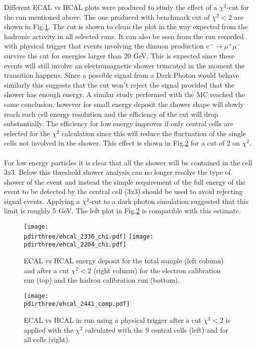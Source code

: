 Different ECAL vs HCAL plots were produced to study the effect of a
$\chi^2$-cut for the run mentioned above. The one produced with
benchmark cut of $\chi^2 < 2$ are shown in
Fig.\ref{fig:ehcal_test}. The cut is shown to clean the plot in the
way expected from the hadronic activity in all selected runs. It can also be seen from the run recorded with physical trigger that events involving the dimuon
production $e^- \to \mu^+\mu^-$ survive the cut for energies larger
than 20 GeV.  This is expected since these events will still involve
an electromagnetic shower truncated in the moment the transition
happens. Since a possible signal from a Dark Photon would behave
similarly this suggests that the cut won't reject the signal provided
that the shower has enough energy. A similar study performed with the
MC reached the same conclusion, however for small energy deposit the shower shape will slowly reach each cell energy resolution and the efficiency of the cut will drop
substantially. The efficiency for low energy improves if only central
cells are selected for the $\chi^2$ calculation since this will reduce
the fluctuation of the single cells not involved in the shower. This
effect is shown in Fig.\ref{fig:ehcal_comp} for a cut of 2 on $\chi^2$.
\\
\\
For low energy particles it is clear that all the shower will be
contained in the cell 3x3. Below this threshold shower analysis can no
longer resolve the type of shower of the event and instead the simple
requirement of the full energy of the event to be detected by the
central cell (3x3) should be used to avoid rejecting signal events. Applying a $\chi^2$-cut to a dark photon simulation suggested that this limit is roughly 5 GeV.  The left plot in Fig.\ref{fig:ehcal_comp} is compatible with this estimate.

\begin{figure}[h!]
  \begin{center}
    \texttt{[image: \\pdirthree/ehcal\_2336\_chi.pdf]}
    \texttt{[image: \\pdirthree/ehcal\_2204\_chi.pdf]}
  \end{center}
  \caption[ECAL vs HCAL energy deposit after a cut $\chi^2$]{ECAL vs HCAL energy deposit for the total sample (left
    column) and after a cut $\chi^2<2$ (right column) for the
    electron calibration run (top) and the hadron calibration run (bottom).}
  \label{fig:ehcal_test}
\end{figure}
\clearpage

\begin{figure}[h!]
  \begin{center}
    \texttt{[image: \\pdirthree/ehcal\_2441\_comp.pdf]}
  \end{center}
  \caption[ECAL vs HCAL energy deposit after a cut $\chi^2$ for different ECAL configurations]{ECAL vs HCAL in run using a physical trigger after a cut $\chi^2<2$ is applied with the $\chi^2$ calculated with the 9 central cells (left) and for all cells (right).}
  \label{fig:ehcal_comp}
\end{figure}

